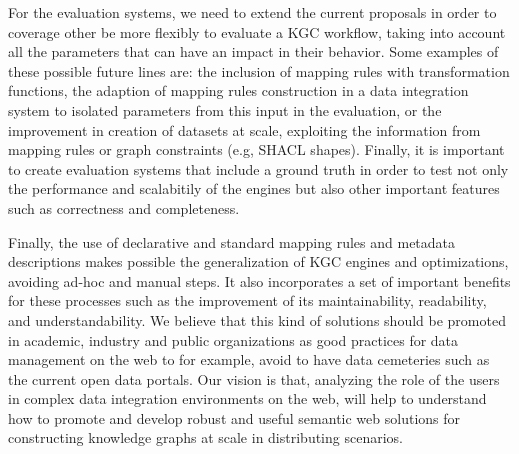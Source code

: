 For the evaluation systems, we need to extend the current proposals in order to coverage other be more flexibly to evaluate a KGC workflow, taking into account all the parameters that can have an impact in their behavior. Some examples of these possible future lines are: the inclusion of mapping rules with transformation functions, the adaption of mapping rules construction in a data integration system to isolated parameters from this input in the evaluation, or the improvement in creation of datasets at scale, exploiting the information from mapping rules or graph constraints (e.g, SHACL shapes). Finally, it is important to create evaluation systems that include a ground truth in order to test not only the performance and scalabitily of the engines but also other important features such as correctness and completeness.

Finally, the use of declarative and standard mapping rules and metadata descriptions makes possible the generalization of KGC engines and optimizations, avoiding ad-hoc and manual steps. It also incorporates a set of important benefits for these processes such as the improvement of its maintainability, readability, and understandability. We believe that this kind of solutions should be promoted in academic, industry and public organizations as good practices for data management on the web to for example, avoid to have data cemeteries such as the current open data portals. Our vision is that, analyzing the role of the users in complex data integration environments on the web, will help to understand how to promote and develop robust and useful semantic web solutions for constructing knowledge graphs at scale in distributing scenarios.

